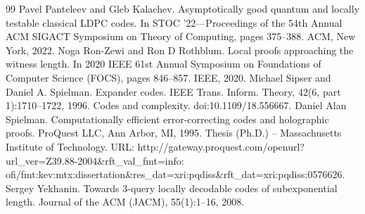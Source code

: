 \begin{thebibliography}{99}
 Pavel Panteleev and Gleb Kalachev. Asymptotically good quantum and locally testable classical LDPC codes. In STOC ’22—Proceedings of the 54th Annual ACM SIGACT Symposium on Theory of Computing, pages 375–388. ACM, New York, 2022.
 Noga Ron-Zewi and Ron D Rothblum. Local proofs approaching the witness length. In 2020 IEEE 61st Annual Symposium on Foundations of Computer Science (FOCS), pages 846–857. IEEE, 2020.
 Michael Sipser and Daniel A. Spielman. Expander codes. IEEE Trans. Inform. Theory, 42(6, part 1):1710–1722, 1996. Codes and complexity. doi:10.1109/18.556667.
 Daniel Alan Spielman. Computationally efficient error-correcting codes and holographic proofs. ProQuest LLC, Ann Arbor, MI, 1995. Thesis (Ph.D.) – Massachusetts Institute of Technology. URL: http://gateway.proquest.com/openurl?url\_ver=Z39.88-2004\&rft\_val\_fmt=info: ofi/fmt:kev:mtx:dissertation\&res\_dat=xri:pqdiss\&rft\_dat=xri:pqdiss:0576626.
 Sergey Yekhanin. Towards 3-query locally decodable codes of subexponential length. Journal of the ACM (JACM), 55(1):1–16, 2008.
\end{thebibliography}
